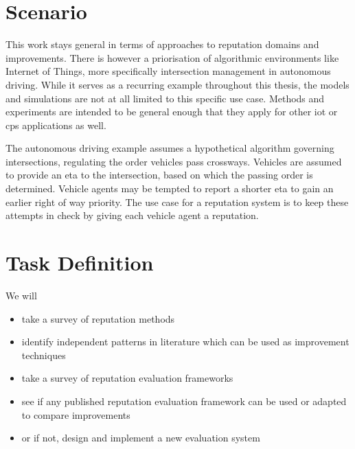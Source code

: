 \documentclass[%
    ]{\PathToTumTemplate/thesis/tum_thesis}
\begin{document}
\section{Scenario}

This work stays general in terms of approaches to reputation domains and improvements.
There is however a priorisation of algorithmic environments like Internet of Things, more specifically intersection management in autonomous driving.
While it serves as a recurring example throughout this thesis, the models and simulations are not at all limited to this specific use case.
Methods and experiments are intended to be general enough that they apply for other \gls{iot} or \gls{cps} applications as well.

The autonomous driving example assumes a hypothetical algorithm governing intersections, regulating the order vehicles pass crossways.
Vehicles are assumed to provide an \gls{eta} to the intersection, based on which the passing order is determined.
Vehicle agents may be tempted to report a shorter \gls{eta} to gain an earlier right of way priority.
The use case for a reputation system is to keep these attempts in check by giving each vehicle agent a reputation.




\section{Task Definition}

We will

\begin{itemize}
    \item take a survey of reputation methods
    \item identify independent patterns in literature which can be used as improvement techniques
    \item take a survey of reputation evaluation frameworks
    \item see if any published reputation evaluation framework can be used or adapted to compare improvements
    \item or if not, design and implement a new evaluation system
\end{itemize}
\end{document}
